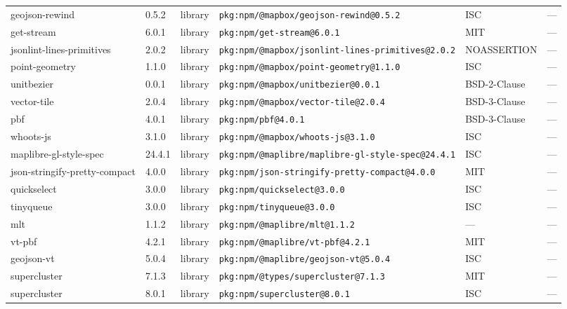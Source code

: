 \documentclass[11pt,a4paper]{article}
\begin{document}
\begin{longtable}{|p{4cm}|p{2cm}|p{1.6cm}|p{5cm}|p{1.5cm}|p{3.5cm}|}
\raggedright geojson-rewind & 0.5.2 & library & \small\texttt{pkg:npm/@mapbox/geojson-rewind@0.5.2} & ISC & \small — \\
\raggedright get-stream & 6.0.1 & library & \small\texttt{pkg:npm/get-stream@6.0.1} & MIT & \small — \\
\raggedright jsonlint-lines-primitives & 2.0.2 & library & \small\texttt{pkg:npm/@mapbox/jsonlint-lines-primitives@2.0.2} & NOASSERTION & \small — \\
\raggedright point-geometry & 1.1.0 & library & \small\texttt{pkg:npm/@mapbox/point-geometry@1.1.0} & ISC & \small — \\
\raggedright unitbezier & 0.0.1 & library & \small\texttt{pkg:npm/@mapbox/unitbezier@0.0.1} & BSD-2-Clause & \small — \\
\raggedright vector-tile & 2.0.4 & library & \small\texttt{pkg:npm/@mapbox/vector-tile@2.0.4} & BSD-3-Clause & \small — \\
\raggedright pbf & 4.0.1 & library & \small\texttt{pkg:npm/pbf@4.0.1} & BSD-3-Clause & \small — \\
\raggedright whoots-js & 3.1.0 & library & \small\texttt{pkg:npm/@mapbox/whoots-js@3.1.0} & ISC & \small — \\
\raggedright maplibre-gl-style-spec & 24.4.1 & library & \small\texttt{pkg:npm/@maplibre/maplibre-gl-style-spec@24.4.1} & ISC & \small — \\
\raggedright json-stringify-pretty-compact & 4.0.0 & library & \small\texttt{pkg:npm/json-stringify-pretty-compact@4.0.0} & MIT & \small — \\
\raggedright quickselect & 3.0.0 & library & \small\texttt{pkg:npm/quickselect@3.0.0} & ISC & \small — \\
\raggedright tinyqueue & 3.0.0 & library & \small\texttt{pkg:npm/tinyqueue@3.0.0} & ISC & \small — \\
\raggedright mlt & 1.1.2 & library & \small\texttt{pkg:npm/@maplibre/mlt@1.1.2} & — & \small — \\
\raggedright vt-pbf & 4.2.1 & library & \small\texttt{pkg:npm/@maplibre/vt-pbf@4.2.1} & MIT & \small — \\
\raggedright geojson-vt & 5.0.4 & library & \small\texttt{pkg:npm/@maplibre/geojson-vt@5.0.4} & ISC & \small — \\
\raggedright supercluster & 7.1.3 & library & \small\texttt{pkg:npm/@types/supercluster@7.1.3} & MIT & \small — \\
\raggedright supercluster & 8.0.1 & library & \small\texttt{pkg:npm/supercluster@8.0.1} & ISC & \small — \\

\end{longtable}
\end{document}
